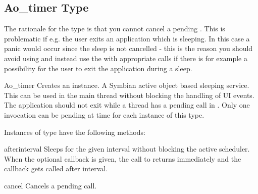 \subsection{Ao\_timer Type}
\label{subsec:Aotimer}

The rationale for the  type is that you cannot cancel a 
pending . This is problematic if e.g. the user exits 
an application which is sleeping. In this case a panic would occur since the 
sleep is not cancelled - this is the reason you should avoid using 
 and instead use the  with 
appropriate  calls if there is for example a possibility for 
the user to exit the application during a sleep.

\begin{classdesc}{Ao_timer}{}
Creates an  instance. A Symbian active object based 
sleeping service. This can be used in the main thread without blocking the 
handling of UI events. The application should not exit while a thread has a 
pending  call in . Only one  
invocation can be pending at time for each instance of this type.
\end{classdesc}

Instances of  type have the following methods:

\begin{methoddesc}[Ao_timer]{after}{interval }
Sleeps for the given interval without blocking the active scheduler. When 
the optional callback is given, the call to  returns 
immediately and the callback gets called after interval.
\end{methoddesc}

\begin{methoddesc}[Ao_timer]{cancel}{}
Cancels a pending  call.
\end{methoddesc}
